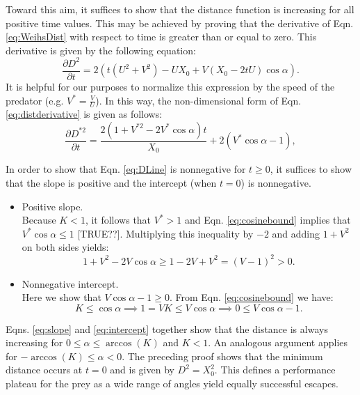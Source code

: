 \documentclass[12pt]{article}
\def\d{\partial}
\begin{document}
Toward this aim, it suffices to show that the distance function is increasing for all positive time values.
This may be achieved by proving that the derivative of Eqn. \ref{eq:WeihsDist} with respect to time is greater than or equal to zero. 
This derivative is given by the following equation:
%
\begin{equation}
\frac{\d D^2}{\d t}  = 2(t(U^2+V^2) - UX_0 + V(X_0-2tU)\cos\alpha).
\label{eq:distderivative}
\end{equation}  
%
It is helpful for our purposes to normalize this expression by the speed of the predator (e.g. $V^*=\frac{V}{U}$).
In this way, the non-dimensional form of Eqn. \ref{eq:distderivative} is given as follows:
%
\begin{equation}
\frac{\d D^{*2}}{\d t}  = \frac{2(1+V^{*2}-2V^*\cos\alpha)t}{X_0} + 2(V^*\cos\alpha -1), 
\label{eq:DLine}
\end{equation}
%

In order to show that Eqn. \ref{eq:DLine} is nonnegative for $t\geq0$, it suffices to show that the slope is positive and the intercept (when $t=0$) is nonnegative. 
%
\begin{itemize}
\item Positive slope. \\
Because $K<1$, it follows that $V^*>1$ and Eqn. \ref{eq:cosinebound} implies that $V^*\cos\alpha \leq 1$ [TRUE??]. 
Multiplying this inequality by $-2$ and adding $1+V^2$ on both sides yields:
%
\begin{equation}
1+V^2 -2V \cos\alpha \geq 1 -2V + V^2 = (V-1)^2 > 0.
\label{eq:slope}
\end{equation}



\item Nonnegative intercept. \\
Here we show that $V\cos \alpha -1 \geq 0.$ From Eqn. \ref{eq:cosinebound} we have:
\begin{equation}
K \leq \cos\alpha \implies 1 = VK \leq V\cos\alpha \implies 0 \leq V\cos \alpha - 1.
\label{eq:intercept}
\end{equation}  
\end{itemize}

%
Eqns. \ref{eq:slope} and  \ref{eq:intercept} together show that the distance is always increasing for $0\leq \alpha \leq \arccos (K)$ and $K<1.$ 
An analogous argument applies for $-\arccos(K) \leq \alpha < 0.$ The preceding proof shows that the minimum distance occurs at $t=0$ and is given by $D^2 = X_0^2.$ This defines a performance plateau for the prey as a wide range of angles yield equally successful escapes. 
\end{document}
